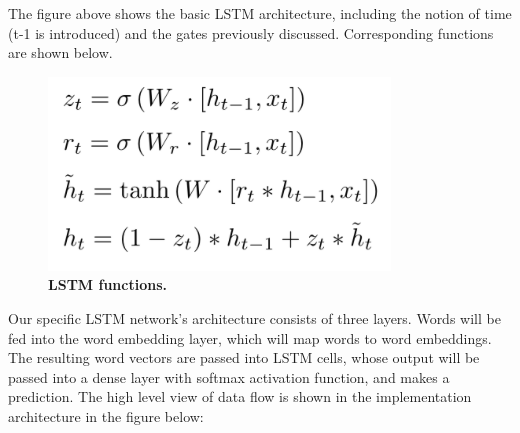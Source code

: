 \documentclass{sig-alternate-05-2015}
\begin{document}
	The figure above shows the basic LSTM architecture, including the notion of time (t-1 is introduced) and the gates previously discussed. Corresponding functions are shown below.
	\begin{figure}[H]
		\centering\includegraphics[scale=0.5]{lstm_functions} 
		\caption{\textbf{ LSTM functions.}}
	\end{figure}
	
	Our specific LSTM network's architecture consists of three layers. Words will be fed into the word embedding layer, which will map words to word embeddings. The resulting word vectors are passed into LSTM cells, whose output will be passed into a dense layer with softmax activation function, and makes a prediction. The high level view of data flow is shown in the implementation architecture in the figure below:
	
\end{document}
